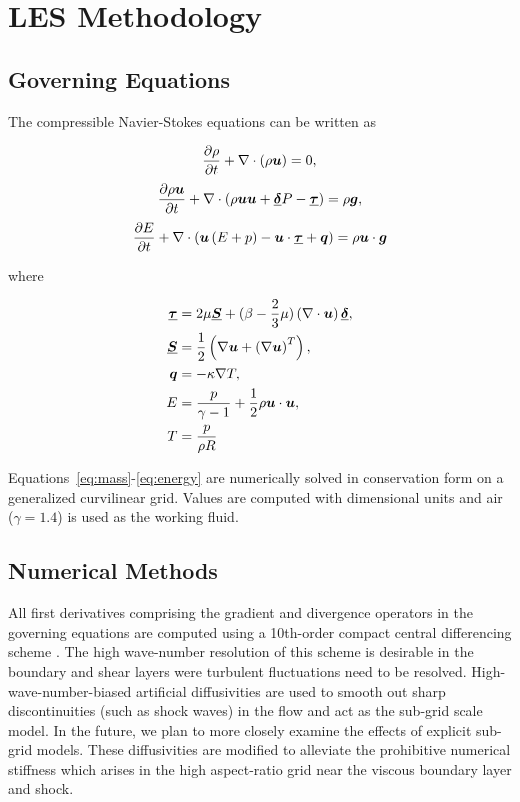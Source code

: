 \documentclass[]{aiaa-tc}%
\newcommand{\divg}{\nabla\cdot}
\newcommand{\grad}{\nabla}
\newcommand{\pd}[2]{\frac{\partial#1}{\partial#2}}
\newcommand{\pth}[1]{\left( #1 \right)}
\def\bgk#1{\mbox{\boldmath $#1$}}
\def\vec#1{\bgk{ #1}}
\def\ten#1{\underline{\bgk{ #1}}}
\begin{document}


\section{LES Methodology}

\subsection{Governing Equations}

The compressible Navier-Stokes  equations can be written as

\begin{equation}
  \pd{\rho}{t} + \divg \pth{ \rho\bgk{u} }  = 0 ,
  \label{eq:mass}
\end{equation}
\begin{equation}
  \pd{\rho\bgk{u}}{t} + \divg \pth{ \rho\bgk{u}\bgk{u} + \ten{\delta} P - \ten{\tau} } = \rho\bgk{g} ,
  \label{eq:mom}
\end{equation}
\begin{equation}
  \pd{E}{t} + \divg \pth{ \bgk{u}\pth{E+p} - \bgk{u}\cdot\ten{\tau} + \vec{q}  }  = \rho\bgk{u}\cdot\bgk{g}
  \label{eq:energy}
\end{equation}


where


\begin{align}
	\ten{\tau} &= 2 \mu \ten{S} +(\beta-\frac{2}{3}\mu) \pth{\divg\bgk{u}}  \ten{\delta}, \\
	\ten{S} &= \frac{1}{2} \pth{  \grad \bgk{u} + \pth{ \grad \bgk{u}}^T }  ,\\
        \vec{q} &= - \kappa \grad T, \\
	E &=  \frac{p}{\gamma-1} + \frac{1}{2}\rho \bgk{u}\cdot\bgk{u}, \\
	T &= \frac{p}{\rho R}
\end{align}

Equations~\ref{eq:mass}-\ref{eq:energy} are numerically solved in conservation form on a generalized curvilinear grid.  Values are computed with dimensional units and air ($\gamma=1.4$) is used as the working fluid.

\subsection{Numerical Methods}


All first derivatives comprising the gradient and divergence operators in the governing equations are computed using a 10th-order compact central differencing scheme \cite{Lele:92}.  The high wave-number resolution of this scheme is desirable in the boundary and shear layers were turbulent fluctuations need to be resolved.  High-wave-number-biased artificial diffusivities \cite{Kawai:10,Cook:07,CookCabot:05} are used to smooth out sharp discontinuities (such as shock waves) in the flow and act as the sub-grid scale model.  In the future, we plan to more closely examine the effects of explicit sub-grid models.  These diffusivities are modified to alleviate the prohibitive numerical stiffness which arises in the high aspect-ratio grid near the viscous boundary layer and shock.
\end{document}
